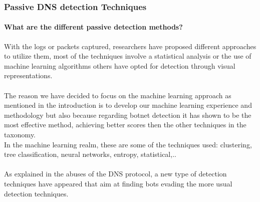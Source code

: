 \subsubsection{Passive DNS detection Techniques}


\paragraph{What are the different passive detection methods?}
With the logs or packets captured, researchers have proposed different approaches to utilize them, most of the techniques involve a statistical analysis or the use of machine learning algorithms others have opted for detection through visual representations. 
\\\\
The reason we have decided to focus on the machine learning approach as mentioned in the introduction is to develop our machine learning experience and methodology but also because regarding botnet detection it has shown to be the most effective method, achieving better scores then the other techniques in the taxonomy.
\\
In the machine learning realm, these are some of the techniques used: clustering, tree classification, neural networks, entropy, statistical,..
\\\\
As explained in the abuses of the DNS protocol, a new type of detection techniques have appeared that aim at finding bots evading the more usual detection techniques. 

